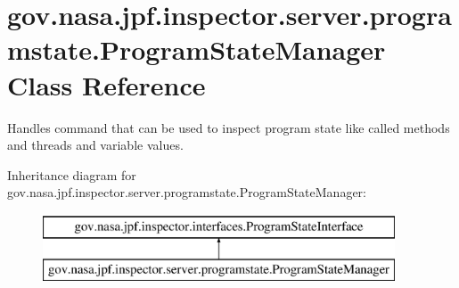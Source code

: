 \hypertarget{classgov_1_1nasa_1_1jpf_1_1inspector_1_1server_1_1programstate_1_1_program_state_manager}{}\section{gov.\+nasa.\+jpf.\+inspector.\+server.\+programstate.\+Program\+State\+Manager Class Reference}
\label{classgov_1_1nasa_1_1jpf_1_1inspector_1_1server_1_1programstate_1_1_program_state_manager}


Handles command that can be used to inspect program state like called methods and threads and variable values.  


Inheritance diagram for gov.\+nasa.\+jpf.\+inspector.\+server.\+programstate.\+Program\+State\+Manager\+:\begin{figure}[H]
\begin{center}
\leavevmode
\includegraphics[height=2.000000cm]{classgov_1_1nasa_1_1jpf_1_1inspector_1_1server_1_1programstate_1_1_program_state_manager}
\end{center}
\end{figure}
